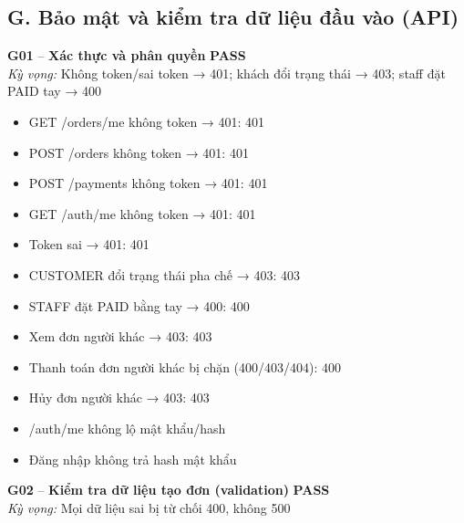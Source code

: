 \documentclass[a4paper,11pt]{article}
\newcommand{\ok}{\textcolor{okgreen}{\textbf{PASS}}}
\begin{document}
\subsection{G. Bảo mật và kiểm tra dữ liệu đầu vào (API)}
\begin{minipage}{\textwidth}\vspace{4pt}\textbf{\textcolor{brew}{G01}} -- \textbf{Xác thực và phân quyền} \hfill \ok\\
{\small\emph{Kỳ vọng:} Không token/sai token → 401; khách đổi trạng thái → 403; staff đặt PAID tay → 400}
\end{minipage}
\begin{itemize}\footnotesize
\item \tick GET /orders/me không token → 401: 401
\item \tick POST /orders không token → 401: 401
\item \tick POST /payments không token → 401: 401
\item \tick GET /auth/me không token → 401: 401
\item \tick Token sai → 401: 401
\item \tick CUSTOMER đổi trạng thái pha chế → 403: 403
\item \tick STAFF đặt PAID bằng tay → 400: 400
\item \tick Xem đơn người khác → 403: 403
\item \tick Thanh toán đơn người khác bị chặn (400/403/404): 400
\item \tick Hủy đơn người khác → 403: 403
\item \tick /auth/me không lộ mật khẩu/hash
\item \tick Đăng nhập không trả hash mật khẩu
\end{itemize}
\begin{minipage}{\textwidth}\vspace{4pt}\textbf{\textcolor{brew}{G02}} -- \textbf{Kiểm tra dữ liệu tạo đơn (validation)} \hfill \ok\\
{\small\emph{Kỳ vọng:} Mọi dữ liệu sai bị từ chối 400, không 500}
\end{minipage}
\end{document}
